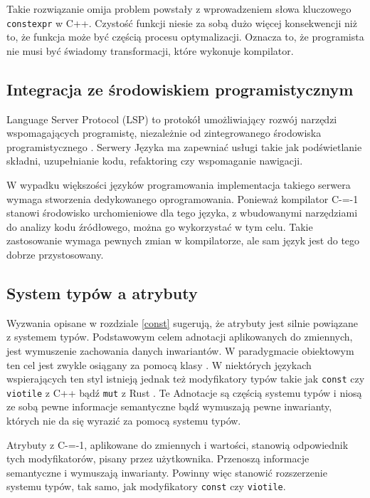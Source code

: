 Takie rozwiązanie omija problem powstały z wprowadzeniem słowa kluczowego \lstinline{constexpr} w C++\cite{Klimiankou:contexpr_great_good_wrong_idea}.
Czystość funkcji niesie za sobą dużo więcej konsekwencji niż to, że funkcja może być częścią procesu optymalizacji.
Oznacza to, że programista nie musi być świadomy transformacji, które wykonuje kompilator.

\subsection{Integracja ze środowiskiem programistycznym}
\label{IDE_integration}

Language Server Protocol (LSP) to protokół umożliwiający rozwój narzędzi wspomagających programistę, niezależnie od zintegrowanego środowiska programistycznego \cite{bunder2019decoupling_lsp}.
Serwery Języka ma zapewniać usługi takie jak podświetlanie składni, uzupełnianie kodu, refaktoring czy wspomaganie nawigacji.

W wypadku większości języków programowania implementacja takiego serwera wymaga stworzenia dedykowanego oprogramowania.
Ponieważ kompilator C-=-1 stanowi środowisko urchomieniowe dla tego języka, z wbudowanymi narzędziami do analizy kodu źródłowego, można go wykorzystać w tym celu.
Takie zastosowanie wymaga pewnych zmian w kompilatorze, ale sam język jest do tego dobrze przystosowany.

\subsection{System typów a atrybuty}
\label{further:adnotated_type_system}

Wyzwania opisane w rozdziale \ref{const} sugerują, że atrybuty jest silnie powiązane z systemem typów.
Podstawowym celem adnotacji aplikowanych do zmiennych, jest wymuszenie zachowania danych inwariantów.
W paradygmacie obiektowym ten cel jest zwykle osiągany za pomocą klasy \cite{oop_paradignm}.
W niektórych językach wspierających ten styl istnieją jednak też modyfikatory typów takie jak \lstinline{const} czy \lstinline{viotile} z C++ bądź \lstinline{mut} z Rust \cite{klabnik2019rust}.
Te Adnotacje są częścią systemu typów i niosą ze sobą pewne informacje semantyczne bądź wymuszają pewne inwarianty, których nie da się wyrazić za pomocą systemu typów.

Atrybuty z C-=-1, aplikowane do zmiennych i wartości, stanowią odpowiednik tych modyfikatorów, pisany przez użytkownika.
Przenoszą informacje semantyczne i wymuszają inwarianty.
Powinny więc stanowić rozszerzenie systemu typów, tak samo, jak modyfikatory \lstinline{const} czy \lstinline{viotile}.

